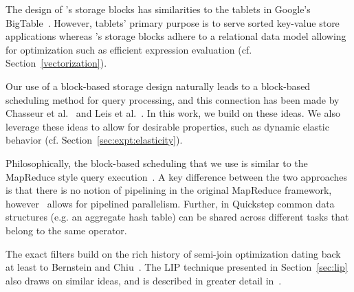 

The design of \Quickstep's storage blocks has similarities to the tablets in Google's BigTable~\cite{DBLP:conf/osdi/ChangDGHWBCFG06}.
However, tablets' primary purpose is to serve sorted key-value store applications whereas  \Quickstep's storage blocks adhere to a  relational data model allowing for optimization such as efficient expression evaluation (cf. Section~\ref{vectorization}).

Our use of a block-based storage design naturally leads to a block-based scheduling method for query processing, and this connection has been made by Chasseur et al.~\cite{quickstep-storage} and Leis et al.~\cite{LeisBK014}.
In this work, we build on these ideas. 
We also leverage these ideas to allow for desirable properties, such as dynamic elastic behavior (cf. Section~\ref{sec:expt:elasticity}).

Philosophically, the block-based scheduling that we use is similar to the MapReduce style query execution~\cite{mapreduce}. 
A key difference between the two approaches is that there is no notion of pipelining in the original MapReduce framework, however \Quickstep\ allows for pipelined parallelism.  Further, in Quickstep common data structures (e.g. an aggregate hash table) can be shared across different tasks that belong to the same operator.

The exact filters build on the rich history of semi-join optimization dating back at least to Bernstein and Chiu~\cite{Bernstein1981SemiJoin}. The LIP technique presented in Section~\ref{sec:lip} also draws on similar ideas, and is described in greater detail in~\cite{DBLP:journals/pvldb/ZhuPSP17}. 

